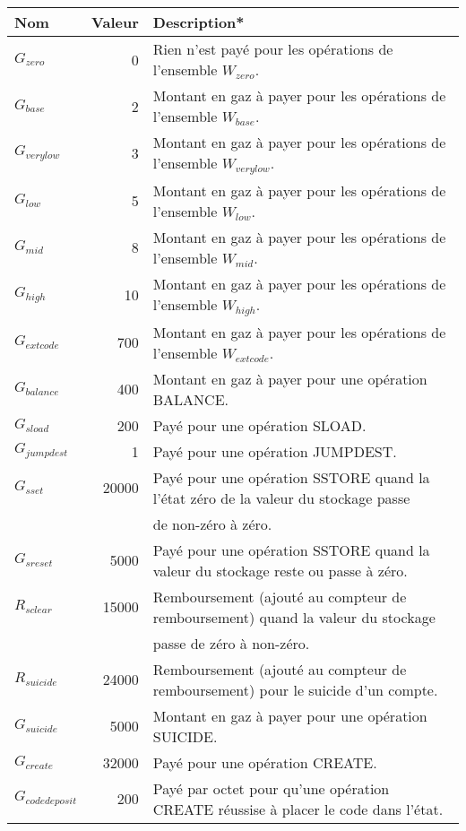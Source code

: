 \documentclass[9pt,oneside]{amsart}
\begin{document}
\begin{tabular*}{\columnwidth}[h]{lrl}
\toprule
Nom & Valeur & Description* \\
\midrule
$G_{zero}$ & 0 & Rien n'est payé pour les opérations de l'ensemble {\small $W_{zero}$}. \\
$G_{base}$ & 2 & Montant en gaz à payer pour les opérations de l'ensemble {\small $W_{base}$}. \\
$G_{verylow}$ & 3 & Montant en gaz à payer pour les opérations de l'ensemble {\small $W_{verylow}$}. \\
$G_{low}$ & 5 & Montant en gaz à payer pour les opérations de l'ensemble {\small $W_{low}$}. \\
$G_{mid}$ & 8 & Montant en gaz à payer pour les opérations de l'ensemble {\small $W_{mid}$}. \\
$G_{high}$ & 10 & Montant en gaz à payer pour les opérations de l'ensemble {\small $W_{high}$}. \\
$G_{extcode}$ & 700 & Montant en gaz à payer pour les opérations de l'ensemble {\small $W_{extcode}$}. \\
$G_{balance}$ & 400 & Montant en gaz à payer pour une opération {\small BALANCE}. \\
$G_{sload}$ & 200 & Payé pour une opération {\small SLOAD}. \\
$G_{jumpdest}$ & 1 & Payé pour une opération {\small JUMPDEST}. \\
$G_{sset}$ & 20000 & Payé pour une opération {\small SSTORE} quand la l'état zéro de la valeur du stockage passe \\
 & & de non-zéro à zéro. \\
$G_{sreset}$ & 5000 & Payé pour une opération {\small SSTORE} quand la valeur du stockage reste ou passe à zéro. \\
$R_{sclear}$ & 15000 & Remboursement (ajouté au compteur de remboursement) quand la valeur du stockage \\
 & & passe de zéro à non-zéro. \\
$R_{suicide}$ & 24000 & Remboursement (ajouté au compteur de remboursement) pour le suicide d'un compte. \\
$G_{suicide}$ & 5000 & Montant en gaz à payer pour une opération {\small SUICIDE}. \\
$G_{create}$ & 32000 & Payé pour une opération {\small CREATE}. \\
$G_{codedeposit}$ & 200 & Payé par octet pour qu'une opération {\small CREATE} réussise à placer le code dans l'état. \\

\end{tabular*}
\end{document}
